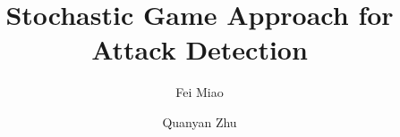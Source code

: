 \documentclass[letterpaper, 10pt, conference, english]{ieeeconf}   %
\begin{document}
\title{\LARGE \bf Stochastic Game Approach for Attack Detection}
\author{Fei Miao \and Quanyan Zhu%
}
\maketitle










{  \small

}
\end{document}
